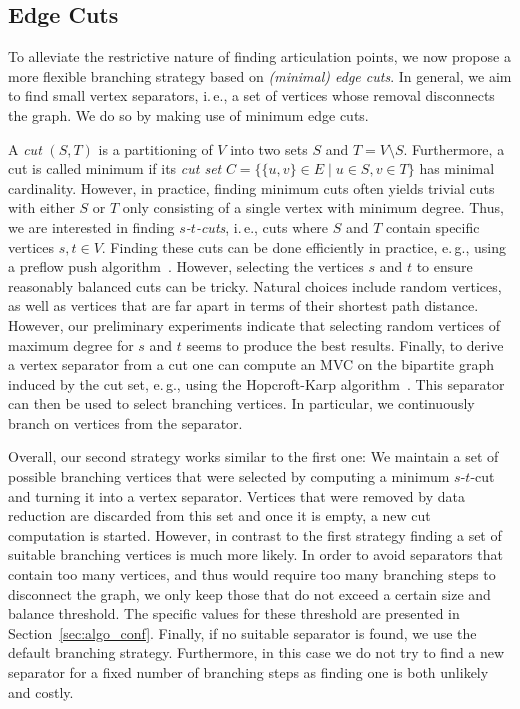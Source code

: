 \documentclass[a4paper,UKenglish,cleveref, autoref, thm-restate]{lipics-v2021}
\newcommand{\ie}{i.\,e.,\xspace}
\newcommand{\eg}{e.\,g.,\xspace}
\begin{document}
\subsection{Edge Cuts}
To alleviate the restrictive nature of finding articulation points, we now propose a more flexible branching strategy based on \emph{(minimal) edge cuts}.
In general, we aim to find small vertex separators, \ie a set of vertices whose removal disconnects the graph.
We do so by making use of minimum edge cuts.

A \emph{cut} $(S,T)$ is a partitioning of $V$ into two sets $S$ and $T=V\setminus S$.
Furthermore, a cut is called minimum if its \emph{cut set} $C = \{\{u,v\} \in E \mid u \in S, v \in T\}$ has minimal cardinality.
However, in practice, finding minimum cuts often yields trivial cuts with either $S$ or $T$ only consisting of a single vertex with minimum degree. 
Thus, we are interested in finding \emph{$s$-$t$-cuts}, \ie cuts where $S$ and $T$ contain specific vertices $s,t \in V$.
Finding these cuts can be done efficiently in practice, \eg using a preflow push algorithm~\cite{goldberg1988new}.
However, selecting the vertices $s$ and $t$ to ensure reasonably balanced cuts can be tricky.
Natural choices include random vertices, as well as vertices that are far apart in terms of their shortest path distance.
However, our preliminary experiments indicate that selecting random vertices of maximum degree
 for $s$ and $t$ seems to produce the best results.
Finally, to derive a vertex separator from a cut one can compute an MVC on the bipartite graph induced by the cut set, \eg using the Hopcroft-Karp algorithm~\cite{hopcroft1973n}.
This separator can then be used to select branching vertices. In particular,
we continuously branch on vertices from the separator.

Overall, our second strategy works similar to the first one: We maintain a set of possible branching vertices that were selected by computing a minimum $s$-$t$-cut and turning it into a vertex separator.
Vertices that were removed by data reduction are discarded from this set and once it is empty, a new cut computation is started.
However, in contrast to the first strategy finding a set of suitable branching vertices is much more likely.
In order to avoid separators that contain too many vertices, and thus would require too many branching steps to disconnect the graph, we only keep those that do not exceed a certain size and balance threshold.
The specific values for these threshold are presented in Section~\ref{sec:algo_conf}.
Finally, if no suitable separator is found, we use the default branching strategy.
Furthermore, in this case we do not try to find a new separator for a fixed number of branching steps as finding one is both unlikely and costly.
\end{document}
